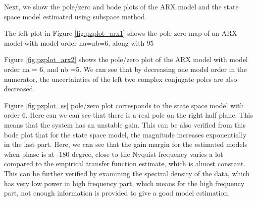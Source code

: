 \documentclass[]{article}
\begin{document}
Next, we show the pole/zero and bode plots of the ARX model and the state space model estimated using subspace method. 

The left plot in Figure \ref{fig:pzplot_arx1} shows the pole-zero map of an ARX model with model order na=nb=6, along with 95%

Figure \ref{fig:pzplot_arx2} shows the pole/zero plot of the ARX model with model order na = 6, and nb =5. We can see that by decreasing one model order in the numerator, the uncertainties of the left two complex conjugate poles are also decreased. 

Figure \ref{fig:pzplot_ss} pole/zero plot corresponds to the state space model with order 6. Here can we can see that there is a real pole on the right half plane. This means that the system has an unstable gain. This can be also verified from this bode plot that for the state space model, the magnitude increases exponentially in the last part.  Here, we can see that the gain margin for the estimated models when phase is at -180 degree, close to the Nyquist frequency varies a lot compared to the empirical transfer function estimate, which is almost constant. This can be further verified by examining the spectral density of the data, which has very low power in high frequency part, which means for the high frequency part, not enough information is provided to give a good model estimation. 
\end{document}
